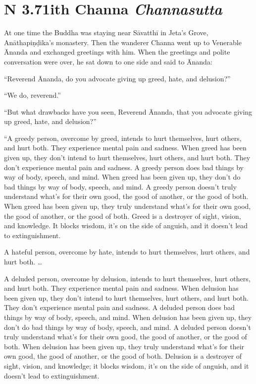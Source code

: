 \documentclass[12pt,openany]{book}%
\newcommand*{\suttatitleacronym}[1]{\smaller[2]{#1}\vspace*{.3em}}
\newcommand*{\suttatitletranslation}[1]{\linebreak{#1}}
\newcommand*{\suttatitleroot}[1]{\linebreak\smaller[2]\itshape{#1}}
\newcommand*{\tocacronym}[1]{\hspace*{-3.3em}{#1}\quad}
\newcommand*{\toctranslation}[1]{#1}
\newcommand*{\tocroot}[1]{(\textit{#1})}
\begin{document}
%
\section*{{\suttatitleacronym AN 3.71}{\suttatitletranslation With Channa }{\suttatitleroot Channasutta}}
\addcontentsline{toc}{section}{\tocacronym{AN 3.71} \toctranslation{With Channa } \tocroot{Channasutta}}

At one time the Buddha was staying near \textsanskrit{Sāvatthī} in Jeta’s Grove, \textsanskrit{Anāthapiṇḍika}’s monastery. Then the wanderer Channa went up to Venerable Ānanda and exchanged greetings with him. When the greetings and polite conversation were over, he sat down to one side and said to Ānanda: 

“Reverend Ānanda, do you advocate giving up greed, hate, and delusion?” 

“We do, reverend.” 

“But what drawbacks have you seen, Reverend Ānanda, that you advocate giving up greed, hate, and delusion?” 

“A greedy person, overcome by greed, intends to hurt themselves, hurt others, and hurt both. They experience mental pain and sadness. When greed has been given up, they don’t intend to hurt themselves, hurt others, and hurt both. They don’t experience mental pain and sadness. A greedy person does bad things by way of body, speech, and mind. When greed has been given up, they don’t do bad things by way of body, speech, and mind. A greedy person doesn’t truly understand what’s for their own good, the good of another, or the good of both. When greed has been given up, they truly understand what’s for their own good, the good of another, or the good of both. Greed is a destroyer of sight, vision, and knowledge. It blocks wisdom, it’s on the side of anguish, and it doesn’t lead to extinguishment. 

A hateful person, overcome by hate, intends to hurt themselves, hurt others, and hurt both. … 

A deluded person, overcome by delusion, intends to hurt themselves, hurt others, and hurt both. They experience mental pain and sadness. When delusion has been given up, they don’t intend to hurt themselves, hurt others, and hurt both. They don’t experience mental pain and sadness. A deluded person does bad things by way of body, speech, and mind. When delusion has been given up, they don’t do bad things by way of body, speech, and mind. A deluded person doesn’t truly understand what’s for their own good, the good of another, or the good of both. When delusion has been given up, they truly understand what’s for their own good, the good of another, or the good of both. Delusion is a destroyer of sight, vision, and knowledge; it blocks wisdom, it’s on the side of anguish, and it doesn’t lead to extinguishment. 
\end{document}

